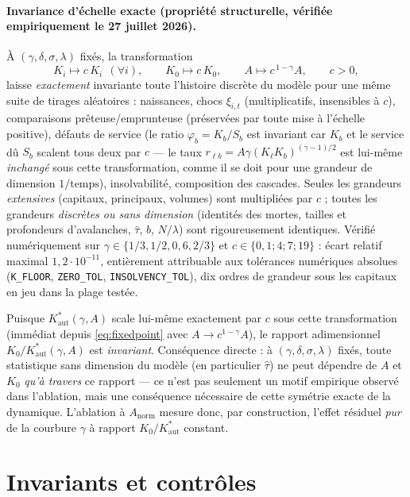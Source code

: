 \documentclass[11pt,a4paper]{article}
\newcommand{\code}[1]{\texttt{#1}}
\newcommand{\Kaut}{K^{*}_{\mathrm{aut}}}
\begin{document}
\paragraph{Invariance d'échelle exacte (propriété structurelle, vérifiée
empiriquement le 27 juillet 2026).} À $(\gamma,\delta,\sigma,\lambda)$
fixés, la transformation
\begin{equation}
K_i \mapsto c\,K_i\ \ (\forall i),\qquad K_0\mapsto c\,K_0,\qquad
A\mapsto c^{\,1-\gamma}A,\qquad c>0,
\end{equation}
laisse \emph{exactement} invariante toute l'histoire discrète du modèle
pour une même suite de tirages aléatoires : naissances, chocs
$\xi_{i,t}$ (multiplicatifs, insensibles à $c$), comparaisons
prêteuse/emprunteuse (préservées par toute mise à l'échelle positive),
défauts de service (le ratio $\varphi_b=K_b/S_b$ est invariant car $K_b$
et le service dû $S_b$ scalent tous deux par $c$ --- le taux
$r_{\ell b}=A\gamma(K_\ell K_b)^{(\gamma-1)/2}$ est lui-même
\emph{inchangé} sous cette transformation, comme il se doit pour une
grandeur de dimension $1/\text{temps}$), insolvabilité, composition des
cascades. Seules les grandeurs \emph{extensives} (capitaux, principaux,
volumes) sont multipliées par $c$ ; toutes les grandeurs \emph{discrètes
ou sans dimension} (identités des mortes, tailles et profondeurs
d'avalanches, $\hat\tau$, $b$, $N/\lambda$) sont rigoureusement
identiques. Vérifié numériquement sur $\gamma\in\{1/3,1/2,0{,}6,2/3\}$
et $c\in\{0{,}1;4;7;19\}$ : écart relatif maximal
$1{,}2\cdot10^{-11}$, entièrement attribuable aux tolérances numériques
absolues (\code{K\_FLOOR}, \code{ZERO\_TOL}, \code{INSOLVENCY\_TOL}),
dix ordres de grandeur sous les capitaux en jeu dans la plage testée.

Puisque $\Kaut(\gamma,A)$ scale lui-même exactement par $c$ sous cette
transformation (immédiat depuis \eqref{eq:fixedpoint} avec
$A\to c^{1-\gamma}A$), le rapport adimensionnel $K_0/\Kaut(\gamma,A)$
est \emph{invariant}. Conséquence directe : à
$(\gamma,\delta,\sigma,\lambda)$ fixés, toute statistique sans dimension
du modèle (en particulier $\hat\tau$) ne peut dépendre de $A$ et $K_0$
\emph{qu'à travers} ce rapport --- ce n'est pas seulement un motif
empirique observé dans l'ablation, mais une conséquence nécessaire de
cette symétrie exacte de la dynamique. L'ablation à $A_{\mathrm{norm}}$
mesure donc, par construction, l'effet résiduel \emph{pur} de la
courbure $\gamma$ à rapport $K_0/\Kaut$ constant.

\section{Invariants et contrôles}
\end{document}
